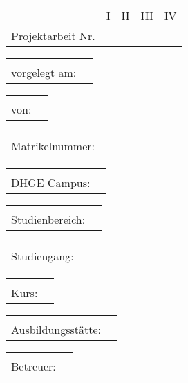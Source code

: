 \vspace{\fill}
\maketitle

\begin{tabular}{rcccc}
	     \hspace{0.45\textwidth} &       I       &     II      &     III     &     IV      \\
	{Projektarbeit Nr.}  \markBox{\CARBEITNR}{&}
\end{tabular}

\begin{tabular}{rl}
	 \hspace{0.45\textwidth} &       \\
	vorgelegt am: & \CDATUM
\end{tabular}

\begin{tabular}{rl}
	\hspace{0.45\textwidth} &              \\
	        von: & \CAUTHOR
\end{tabular}

\begin{tabular}{rl}
	\hspace{0.45\textwidth} &         \\
	 Matrikelnummer: & \CMATRIKEL
\end{tabular}

\begin{tabular}{rl}
	\hspace{0.45\textwidth} &      \\
	DHGE Campus: & \CCAMPUS
\end{tabular}

\begin{tabular}{rl}
	 \hspace{0.45\textwidth} &         \\
	Studienbereich: & \CBEREICH
\end{tabular}

\begin{tabular}{rl}
	\hspace{0.45\textwidth} &                       \\
	Studiengang: & \CSTUDIENGANG
\end{tabular}

\begin{tabular}{rl}
	\hspace{0.45\textwidth} &       \\
	       Kurs: & \CKURS
\end{tabular}

\begin{tabular}{rl}
	\hspace{0.45\textwidth} &          \\
	Ausbildungsstätte: & \CBETRIEB
\end{tabular}

\begin{tabular}{rl}
	\hspace{0.45\textwidth} &          \\
	   Betreuer: & \CBETREUER
\end{tabular}

\vspace*{\fill}

\pagebreak
